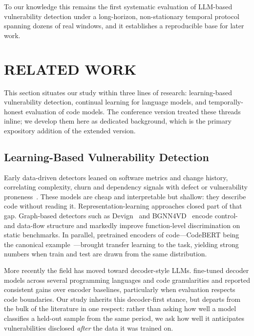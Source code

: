 \documentclass[a4paper,twoside]{article}
\begin{document}
To our knowledge this remains the first systematic evaluation of LLM-based vulnerability detection under a long-horizon, non-stationary temporal protocol spanning dozens of real windows, and it establishes a reproducible base for later work.

\section{\uppercase{Related Work}}
\label{sec:related}

\noindent This section situates our study within three lines of research: learning-based vulnerability detection, continual learning for language models, and temporally-honest evaluation of code models. The conference version treated these threads inline; we develop them here as dedicated background, which is the primary expository addition of the extended version.

\subsection{Learning-Based Vulnerability Detection}
\label{sec:related-vd}

\noindent Early data-driven detectors leaned on software metrics and change history, correlating complexity, churn and dependency signals with defect or vulnerability proneness~\citep{Shin2011Complexity,Jimenez2016VPM}. These models are cheap and interpretable but shallow: they describe code without reading it. Representation-learning approaches closed part of that gap. Graph-based detectors such as Devign~\citep{Zhou2019Devign} and BGNN4VD~\citep{Cao2021BGNN4VD} encode control- and data-flow structure and markedly improve function-level discrimination on static benchmarks. In parallel, pretrained encoders of code---CodeBERT being the canonical example~\citep{Feng2020CodeBERT}---brought transfer learning to the task, yielding strong numbers when train and test are drawn from the same distribution.

More recently the field has moved toward decoder-style LLMs. \citet{Konno2025Taltech} fine-tuned decoder models across several programming languages and code granularities and reported consistent gains over encoder baselines, particularly when evaluation respects code boundaries. Our study inherits this decoder-first stance, but departs from the bulk of the literature in one respect: rather than asking how well a model classifies a held-out sample from the same period, we ask how well it anticipates vulnerabilities disclosed \emph{after} the data it was trained on.
\end{document}
